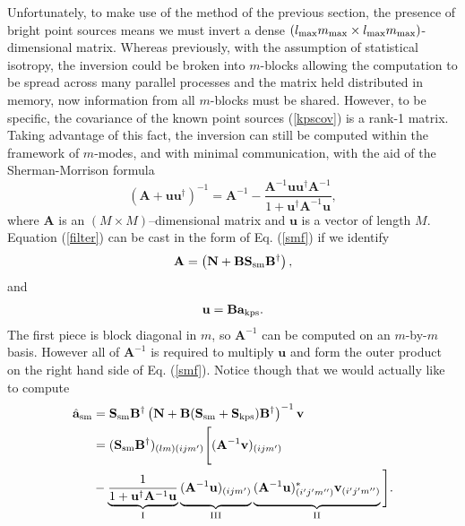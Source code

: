 Unfortunately, to make use of the method of the previous section, the presence of bright point sources means we must invert a dense $(l_{\rm max}m_{\rm max} \times l_{\rm max}m_{\rm max})$-dimensional matrix. Whereas previously, with the assumption of statistical isotropy, the inversion could be broken into $m$-blocks allowing the computation to be spread across many parallel processes and the matrix held distributed in memory, now information from all $m$-blocks must be shared. However, to be specific, the covariance of the known point sources (\ref{kpscov}) is a rank-1 matrix. Taking advantage of this fact, the inversion can still be computed within the framework of $m$-modes, and with minimal communication, with the aid of the Sherman-Morrison formula \citep{smf1, smf2}
\begin{equation}
(\mathbf{A} + \mathbf{uu}^{\dagger})^{-1} = \mathbf{A}^{-1} - \frac{\mathbf{A}^{-1}\mathbf{u}\mathbf{u}^{\dagger}\mathbf{A}^{-1}}{1+\mathbf{u}^{\dagger}\mathbf{A}^{-1}\mathbf{u}}, \label{smf}
\end{equation}
where $\mathbf{A}$ is an $(M \times M)$--dimensional matrix and $\mathbf{u}$ is a vector of length $M$.
Equation (\ref{filter}) can be cast in the form of Eq. (\ref{smf}) if we identify
\begin{align}
\mathbf{A}  = \left( \mathbf{N} + \mathbf{B}\mathbf{S}_{\rm sm}\mathbf{B}^{\dagger}\right),
\end{align}
and
\begin{align}
\mathbf{u} = \mathbf{B}\mathbf{a}_{\rm kps}.
\end{align}
The first piece is block diagonal in $m$, so $\mathbf{A}^{-1}$ can be computed on an $m$-by-$m$ basis. However all of $\mathbf{A}^{-1}$ is required to multiply $\mathbf{u}$ and form the outer product on the right hand side of Eq. (\ref{smf}). Notice though that we would actually like to compute
\begin{align}
\hat{\mathbf{a}}_{\rm sm} &= \mathbf{S}_{\rm sm}\mathbf{B}^{\dagger}\left( \mathbf{N} + \mathbf{B}(\mathbf{S}_{\rm sm} + \mathbf{S}_{\rm kps})\mathbf{B}^{\dagger}\right)^{-1}\mathbf{v}
\nonumber \\
&= (\mathbf{S}_{\rm sm}\mathbf{B}^{\dagger})_{(lm)(ijm')}
\Bigg[ (\mathbf{A}^{-1}\mathbf{v})_{(ijm')}
\nonumber \\
&- \underbrace{\frac{1}{1+\mathbf{u}^{\dagger}\mathbf{A}^{-1}\mathbf{u}}}_{\text{\RNum{1}}}
 \underbrace{\vphantom{\frac{1}{1+\mathbf{u}^{\dagger}\mathbf{A}^{-1}\mathbf{u}}}(\mathbf{A}^{-1}\mathbf{u})_{(ijm')}}_{\text{\RNum{3}}}
  \underbrace{\vphantom{\frac{1}{1+\mathbf{u}^{\dagger}\mathbf{A}^{-1}\mathbf{u}}}(\mathbf{A}^{-1}\mathbf{u})^*_{(i'j'm'')} \mathbf{v}_{(i'j'm'')}}_{\text{\RNum{2}}}
\Bigg].
\label{expand}
\end{align}
